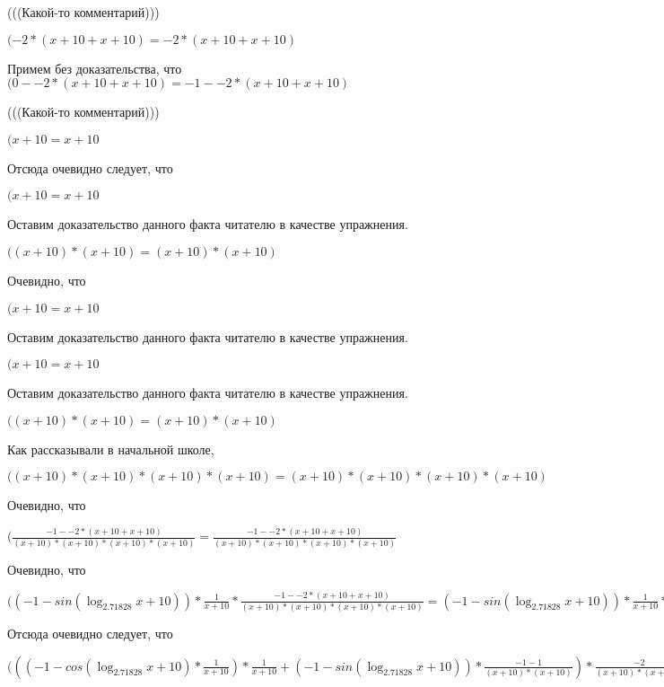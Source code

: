 \documentclass[12pt,a4paper,fleqn]{article}
\theoremstyle{definition}
\begin{document}
(((Какой-то комментарий)))

$( -2  * ( x  +  10  +  x  +  10 ) =  -2  * ( x  +  10  +  x  +  10 )$

Примем без доказательства, что
$( 0  -  -2  * ( x  +  10  +  x  +  10 ) =  -1  -  -2  * ( x  +  10  +  x  +  10 )$

(((Какой-то комментарий)))

$( x  +  10  =  x  +  10 $

Отсюда очевидно следует, что

$( x  +  10  =  x  +  10 $

Оставим доказательство данного факта читателю в качестве упражнения.

$(( x  +  10 ) * ( x  +  10 ) = ( x  +  10 ) * ( x  +  10 )$

Очевидно, что

$( x  +  10  =  x  +  10 $

Оставим доказательство данного факта читателю в качестве упражнения.

$( x  +  10  =  x  +  10 $

Оставим доказательство данного факта читателю в качестве упражнения.

$(( x  +  10 ) * ( x  +  10 ) = ( x  +  10 ) * ( x  +  10 )$

Как рассказывали в начальной школе,

$(( x  +  10 ) * ( x  +  10 ) * ( x  +  10 ) * ( x  +  10 ) = ( x  +  10 ) * ( x  +  10 ) * ( x  +  10 ) * ( x  +  10 )$

Очевидно, что

$(\frac{ -1  -  -2  * ( x  +  10  +  x  +  10 )}{( x  +  10 ) * ( x  +  10 ) * ( x  +  10 ) * ( x  +  10 )}
 = \frac{ -1  -  -2  * ( x  +  10  +  x  +  10 )}{( x  +  10 ) * ( x  +  10 ) * ( x  +  10 ) * ( x  +  10 )}
$

Очевидно, что

$(( -1  - sin(\log_{ 2.71828 }{ x  +  10 })) * \frac{ 1 }{ x  +  10 }
 * \frac{ -1  -  -2  * ( x  +  10  +  x  +  10 )}{( x  +  10 ) * ( x  +  10 ) * ( x  +  10 ) * ( x  +  10 )}
 = ( -1  - sin(\log_{ 2.71828 }{ x  +  10 })) * \frac{ 1 }{ x  +  10 }
 * \frac{ -1  -  -2  * ( x  +  10  +  x  +  10 )}{( x  +  10 ) * ( x  +  10 ) * ( x  +  10 ) * ( x  +  10 )}
$

Отсюда очевидно следует, что

$((( -1  - cos(\log_{ 2.71828 }{ x  +  10 }) * \frac{ 1 }{ x  +  10 }
) * \frac{ 1 }{ x  +  10 }
 + ( -1  - sin(\log_{ 2.71828 }{ x  +  10 })) * \frac{ -1  -  1 }{( x  +  10 ) * ( x  +  10 )}
) * \frac{ -2 }{( x  +  10 ) * ( x  +  10 )}
 + ( -1  - sin(\log_{ 2.71828 }{ x  +  10 })) * \frac{ 1 }{ x  +  10 }
 * \frac{ -1  -  -2  * ( x  +  10  +  x  +  10 )}{( x  +  10 ) * ( x  +  10 ) * ( x  +  10 ) * ( x  +  10 )}
 = (( -1  - cos(\log_{ 2.71828 }{ x  +  10 }) * \frac{ 1 }{ x  +  10 }
) * \frac{ 1 }{ x  +  10 }
 + ( -1  - sin(\log_{ 2.71828 }{ x  +  10 })) * \frac{ -1  -  1 }{( x  +  10 ) * ( x  +  10 )}
) * \frac{ -2 }{( x  +  10 ) * ( x  +  10 )}
 + ( -1  - sin(\log_{ 2.71828 }{ x  +  10 })) * \frac{ 1 }{ x  +  10 }
 * \frac{ -1  -  -2  * ( x  +  10  +  x  +  10 )}{( x  +  10 ) * ( x  +  10 ) * ( x  +  10 ) * ( x  +  10 )}
$
\end{document}
